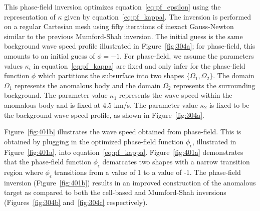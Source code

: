 \documentclass[manuscript,revised]{geophysics}
\begin{document}
This phase-field inversion optimizes equation~\ref{eq:pf_epsilon} using the representation of $\kappa$ given by equation~\ref{eq:pf_kappa}. The inversion is performed on a regular Cartesian mesh using fifty iterations of inexact Gauss-Newton similar to the previous Mumford-Shah inversion. The initial guess is the same background wave speed profile illustrated in Figure~\ref{fig:304a}; for phase-field, this amounts to an initial guess of $\phi=-1$.  For phase-field, we assume the parameters values $\kappa_i$ in equation~\ref{eq:pf_kappa} are fixed and only infer for the phase-field function $\phi$ which partitions the subsurface into two shapes $\{\Omega_1,\Omega_2 \}$. The domain $\Omega_1$ represents the anomalous body and the domain $\Omega_2$ represents the surrounding background. The parameter value $\kappa_1$ represents the wave speed within the anomalous body and is fixed at 4.5 km/s. The parameter value $\kappa_2$ is fixed to be the background wave speed profile, as shown in Figure~\ref{fig:304a}.

Figure~\ref{fig:401b} illustrates the wave speed obtained from phase-field.  This is obtained by plugging in the optimized phase-field function $\phi_\epsilon$, illustrated in Figure~\ref{fig:401a}, into equation~\ref{eq:pf_kappa}.  Figure~\ref{fig:401a} demonstrates that the phase-field function $\phi_\epsilon$ demarcates two shapes with a narrow transition region where $\phi_\epsilon$ transitions from a value of 1 to a value of -1. The phase-field inversion (Figure~\ref{fig:401b}) results in an improved construction of the anomalous target as compared to both the cell-based and Mumford-Shah inversions (Figures~\ref{fig:304b} and~\ref{fig:304c} respectively).
\end{document}
